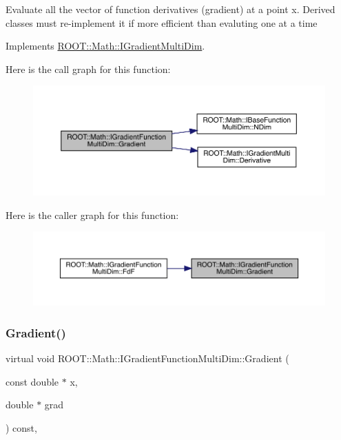 Evaluate all the vector of function derivatives (gradient) at a point x. Derived classes must re-\/implement it if more efficient than evaluting one at a time 

Implements \mbox{\hyperlink{classROOT_1_1Math_1_1IGradientMultiDim_ac5785e2df4fa36061bf9ddbb9ce4dde0}{R\+O\+O\+T\+::\+Math\+::\+I\+Gradient\+Multi\+Dim}}.

Here is the call graph for this function\+:
\nopagebreak
\begin{figure}[H]
\begin{center}
\leavevmode
\includegraphics[width=350pt]{da/d1a/classROOT_1_1Math_1_1IGradientFunctionMultiDim_ab65a713d2637c69b334d2119ef4f0e26_cgraph}
\end{center}
\end{figure}
Here is the caller graph for this function\+:
\nopagebreak
\begin{figure}[H]
\begin{center}
\leavevmode
\includegraphics[width=350pt]{da/d1a/classROOT_1_1Math_1_1IGradientFunctionMultiDim_ab65a713d2637c69b334d2119ef4f0e26_icgraph}
\end{center}
\end{figure}
\mbox{\label{classROOT_1_1Math_1_1IGradientFunctionMultiDim_ab65a713d2637c69b334d2119ef4f0e26}} 
\subsubsection{\texorpdfstring{Gradient()}{Gradient()}\hspace{0.1cm}{\footnotesize\ttfamily [2/3]}}
{\footnotesize\ttfamily virtual void R\+O\+O\+T\+::\+Math\+::\+I\+Gradient\+Function\+Multi\+Dim\+::\+Gradient (\begin{DoxyParamCaption}\item[{const double $\ast$}]{x,  }\item[{double $\ast$}]{grad }\end{DoxyParamCaption}) const\hspace{0.3cm}{\ttfamily [inline]}, {\ttfamily [virtual]}}


